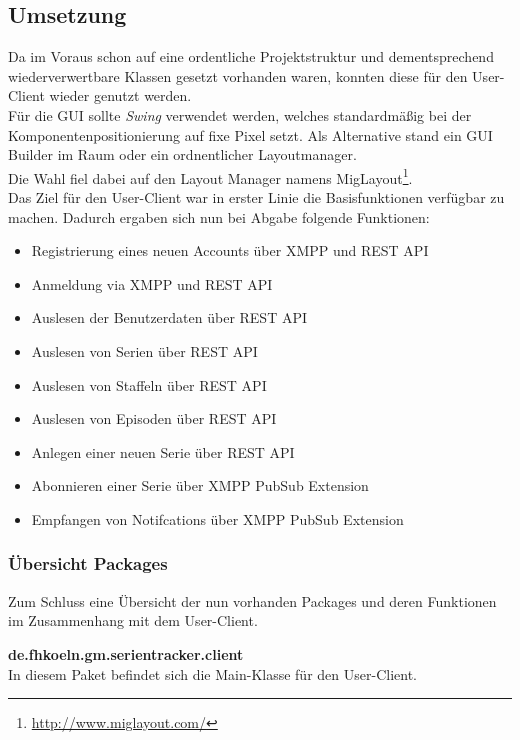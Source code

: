 \newpage
\subsection{Umsetzung}

Da im Voraus schon auf eine ordentliche Projektstruktur und dementsprechend wiederverwertbare Klassen gesetzt vorhanden waren, konnten diese für den User-Client wieder genutzt werden.\\

Für die GUI sollte \textit{Swing} verwendet werden, welches standardmäßig bei der Komponentenpositionierung auf fixe Pixel setzt. Als Alternative stand ein GUI Builder im Raum oder ein ordnentlicher Layoutmanager.\\
Die Wahl fiel dabei auf den Layout Manager namens MigLayout\footnote{\url{http://www.miglayout.com/}}.\\

Das Ziel für den User-Client war in erster Linie die Basisfunktionen verfügbar zu machen. Dadurch ergaben sich nun bei Abgabe folgende Funktionen:

\begin{itemize}
  \item Registrierung eines neuen Accounts über XMPP und REST API
  \item Anmeldung via XMPP und REST API
  \item Auslesen der Benutzerdaten über REST API
  \item Auslesen von Serien über REST API
  \item Auslesen von Staffeln über REST API
  \item Auslesen von Episoden über REST API
  \item Anlegen einer neuen Serie über REST API
  \item Abonnieren einer Serie über XMPP PubSub Extension
  \item Empfangen von Notifcations über XMPP PubSub Extension
\end{itemize}

\subsubsection{Übersicht Packages}

Zum Schluss eine Übersicht der nun vorhanden Packages und deren Funktionen im Zusammenhang mit dem User-Client.


\textbf{de.fhkoeln.gm.serientracker.client}\\
In diesem Paket befindet sich die Main-Klasse für den User-Client.

